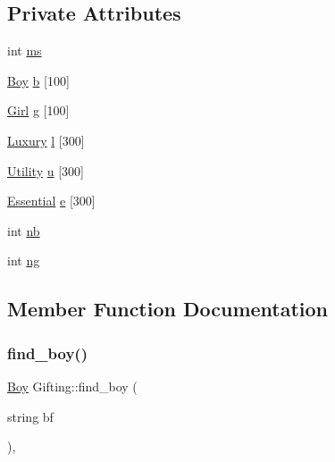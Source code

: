 \subsection*{Private Attributes}
\begin{DoxyCompactItemize}
\item 
int \hyperlink{classGifting_a5a85a378002d557380d4f628fcd5b5f0}{ms}
\item 
\hyperlink{classBoy}{Boy} \hyperlink{classGifting_a32c584d87e5297ca62adc4395f41ad61}{b} \mbox{[}100\mbox{]}
\item 
\hyperlink{classGirl}{Girl} \hyperlink{classGifting_aaa50a1001fb40c479692ecf366ef1710}{g} \mbox{[}100\mbox{]}
\item 
\hyperlink{classLuxury}{Luxury} \hyperlink{classGifting_aebc22d7755aed159f6a48ae14bdc25bf}{l} \mbox{[}300\mbox{]}
\item 
\hyperlink{classUtility}{Utility} \hyperlink{classGifting_ac68eb228c394203ff3c5fb6d18198a88}{u} \mbox{[}300\mbox{]}
\item 
\hyperlink{classEssential}{Essential} \hyperlink{classGifting_a52e10b09dca04f0cc1e5337e5a47be40}{e} \mbox{[}300\mbox{]}
\item 
int \hyperlink{classGifting_a867803317f27c84b678559ce589ce01f}{nb}
\item 
int \hyperlink{classGifting_a7809d37f157e44f790f5e0f921ce6b92}{ng}
\end{DoxyCompactItemize}


\subsection{Member Function Documentation}
\mbox{\label{classGifting_aa3918dda151ab90e1508c0fd13798807}} 
\subsubsection{\texorpdfstring{find\+\_\+boy()}{find\_boy()}}
{\footnotesize\ttfamily \hyperlink{classBoy}{Boy} Gifting\+::find\+\_\+boy (\begin{DoxyParamCaption}\item[{string}]{bf }\end{DoxyParamCaption})\hspace{0.3cm}{\ttfamily [inline]}, {\ttfamily [private]}}

\mbox{\label{classGifting_a0a8dade411e6c802b97797a92ef1302a}} 

